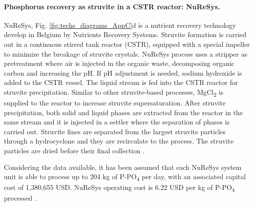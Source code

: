 \begin{refsection}[referencesCh4]
\begin{table}[h] 
		\centering
		\caption{Sizing and equipment cost estimated for Ostara Pearl process.} \label{table:ostara_costs}
\end{table}

\paragraph{Phosphorus recovery as struvite in a CSTR reactor: \newline NuReSys.}
NuReSys, Fig. \ref{fig:techs_diagrams_AppC}d is a nutrient recovery technology develop in Belgium by Nutrients Recovery Systems. Struvite formation is carried out in a continuous stirred tank reactor (CSTR), equipped with a special impeller to minimize the breakage of struvite crystals. NuReSys process uses a stripper as pretreatment where air is injected in the organic waste, decomposing organic carbon and increasing the pH. If pH adjustment is needed, sodium hydroxide is added to the CSTR vessel. The liquid stream is fed into the CSTR reactor for struvite precipitation. Similar to other struvite-based processes, MgCl\textsubscript{2} is supplied to the reactor to increase struvite supersaturation. After struvite precipitation, both solid and liquid phases are extracted from the reactor in the same stream and it is injected in a settler where the separation of phases is carried out. Struvite fines are separated from the largest struvite particles through a hydrocyclone and they are recirculate to the process. The struvite particles are dried before their final collection \citep{Pearl2Kcost2}.

Considering the data available, it has been assumed that each NuReSys system unit is able to process up to 204 kg of P-PO\textsubscript{4} per day, with an associated capital cost of 1,380,655 USD. NuReSys operating cost is 6.22 USD per kg of P-PO\textsubscript{4} processed \citep{Pearl2Kcost2}.


\end{refsection}
